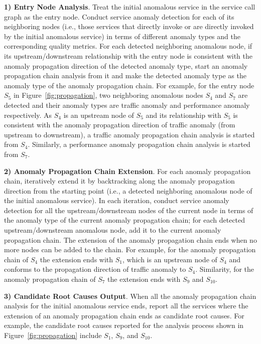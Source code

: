 \textbf{1) Entry Node Analysis}.
Treat the initial anomalous service in the service call graph as the entry node.
Conduct service anomaly detection for each of its neighboring nodes (i.e., those services that directly invoke or are directly invoked by the initial anomalous service) in terms of different anomaly types and the corresponding quality metrics.
For each detected neighboring anomalous node, if its upstream/downstream relationship with the entry node is consistent with the anomaly propagation direction of the detected anomaly type, start an anomaly propagation chain analysis from it and make the detected anomaly type as the anomaly type of the anomaly propagation chain.
For example, for the entry node $S_5$ in Figure~\ref{fig:propagation}, two neighboring anomalous nodes $S_4$ and $S_7$ are detected and their anomaly types are traffic anomaly and performance anomaly respectively.
As $S_4$ is an upstream node of $S_5$ and its relationship with $S_5$ is consistent with the anomaly propagation direction of traffic anomaly (from upstream to downstream), a traffic anomaly propagation chain analysis is started from $S_4$.
Similarly, a performance anomaly propagation chain analysis is started from $S_7$.

\textbf{2) Anomaly Propagation Chain Extension}.
For each anomaly propagation chain, iteratively extend it by backtracking along the anomaly propagation direction from the starting point (i.e., a detected neighboring anomalous node of the initial anomalous service).
In each iteration, conduct service anomaly detection for all the upstream/downstream nodes of the current node in terms of the anomaly type of the current anomaly propagation chain; for each detected upstream/downstream anomalous node, add it to the current anomaly propagation chain.
The extension of the anomaly propagation chain ends when no more nodes can be added to the chain.
For example, for the anomaly propagation chain of $S_4$ the extension ends with $S_1$, which is an upstream node of $S_4$ and conforms to the propagation direction of traffic anomaly to $S_4$.
Similarity, for the anomaly propagation chain of $S_7$ the extension ends with $S_9$ and $S_{10}$.

\textbf{3) Candidate Root Causes Output}.
When all the anomaly propagation chain analysis for the initial anomalous service ends, report all the services where the extension of an anomaly propagation chain ends as candidate root causes.
For example, the candidate root causes reported for the analysis process shown in Figure~\ref{fig:propagation} include $S_1$, $S_9$, and $S_{10}$.
